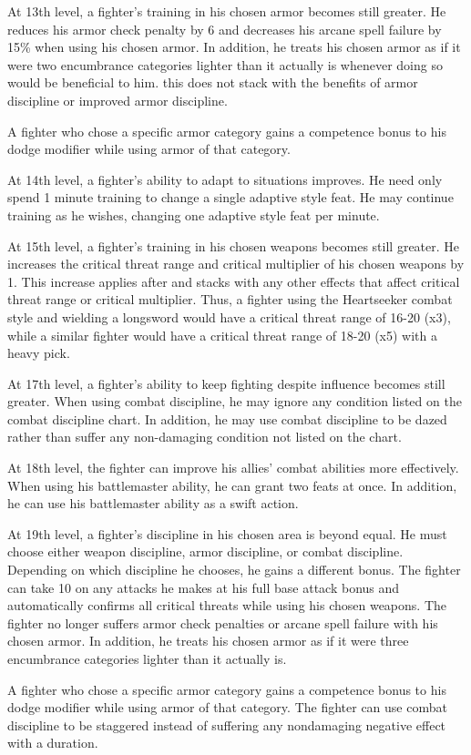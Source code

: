  At 13th level, a fighter's training in his chosen armor becomes still greater. He reduces his armor check penalty by 6 and decreases his arcane spell failure by 15\% when using his chosen armor. In addition, he treats his chosen armor as if it were two encumbrance categories lighter than it actually is whenever doing so would be beneficial to him. this does not stack with the benefits of armor discipline or improved armor discipline.
\par A fighter who chose a specific armor category gains a  competence bonus to his dodge modifier while using armor of that category.

 At 14th level, a fighter's ability to adapt to situations improves. He need only spend 1 minute training to change a single adaptive style feat. He may continue training as he wishes, changing one adaptive style feat per minute.

 At 15th level, a fighter's training in his chosen weapons becomes still greater. He increases the critical threat range and critical multiplier of his chosen weapons by 1. This increase applies after and stacks with any other effects that affect critical threat range or critical multiplier. Thus, a fighter using the Heartseeker combat style and wielding a longsword would have a critical threat range of 16-20 (x3), while a similar fighter would have a critical threat range of 18-20 (x5) with a heavy pick.

 At 17th level, a fighter's ability to keep fighting despite influence becomes still greater. When using combat discipline, he may ignore any condition listed on the combat discipline chart. In addition, he may use combat discipline to be dazed rather than suffer any non-damaging condition not listed on the chart.

 At 18th level, the fighter can improve his allies' combat abilities more effectively. When using his battlemaster ability, he can grant two feats at once. In addition, he can use his battlemaster ability as a swift action.

 At 19th level, a fighter's discipline in his chosen area is beyond equal. He must choose either weapon discipline, armor discipline, or combat discipline. Depending on which discipline he chooses, he gains a different bonus.
 The fighter can take 10 on any attacks he makes at his full base attack bonus and automatically confirms all critical threats while using his chosen weapons.
 The fighter no longer suffers armor check penalties or arcane spell failure with his chosen armor. In addition, he treats his chosen armor as if it were three encumbrance categories lighter than it actually is.
\par A fighter who chose a specific armor category gains a  competence bonus to his dodge modifier while using armor of that category.
 The fighter can use combat discipline to be staggered instead of suffering any nondamaging negative effect with a duration.

